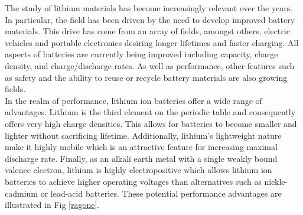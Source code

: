 



 

The study of lithium materials has become increasingly relevant over the years.  In particular, the field has been driven by the need to develop improved battery materials.  This drive has come from an array of fields, amongst others, electric vehicles and portable electronics desiring longer lifetimes and faster charging.  All aspects of batteries are currently being improved including capacity, charge density, and charge/discharge rates.  As well as performance, other features such as safety and the ability to reuse or recycle battery materials are also growing fields.  \\
In the realm of performance, lithium ion batteries offer a wide range of advantages.  Lithium is the third element on the periodic table and consequently offers very high charge densities.  This allows for batteries to become smaller and lighter without sacrificing lifetime.  Additionally, lithium's lightweight nature make it highly mobile which is an attractive feature for increasing maximal discharge rate.  Finally, as an alkali earth metal with a single weakly bound valence electron, lithium is highly electropositive  which allows lithium ion batteries to achieve higher operating voltages than alternatives such as nickle-cadmium or lead-acid batteries.  These potential performance advantages are illustrated in Fig \ref{ragone}.
\\

